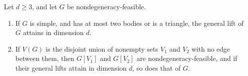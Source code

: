 \begin{lemma}
  \label{lem:pencil-d-lift-small}
  \leanok
  Let $d \ge 3$, and let $G$ be nondegeneracy-feasible.
  \begin{enumerate}
    \item If $G$ is simple, and has at most two bodies or is a triangle,
      the general lift of $G$ attains in dimension $d$.
    \item If $V(G)$ is the disjoint union of nonempty sets $V_1$ and $V_2$
      with no edge between them, then $G[V_1]$ and $G[V_2]$ are
      nondegeneracy-feasible, and if their general lifts attain in
      dimension $d$, so does that of $G$.
  \end{enumerate}
\end{lemma}
